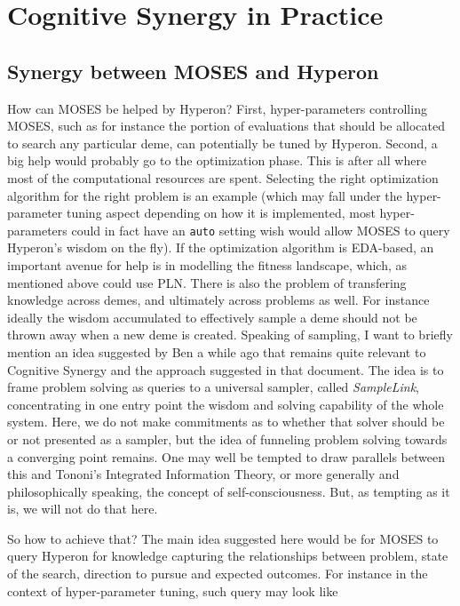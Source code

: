 \documentclass[]{report}
\begin{document}
\chapter{Cognitive Synergy in Practice}

\section{Synergy between MOSES and Hyperon}

How can MOSES be helped by Hyperon?  First, hyper-parameters
controlling MOSES, such as for instance the portion of evaluations
that should be allocated to search any particular deme, can
potentially be tuned by Hyperon.  Second, a big help would probably go
to the optimization phase.  This is after all where most of the
computational resources are spent.  Selecting the right optimization
algorithm for the right problem is an example (which may fall under
the hyper-parameter tuning aspect depending on how it is implemented,
most hyper-parameters could in fact have an \texttt{auto} setting wish
would allow MOSES to query Hyperon's wisdom on the fly).  If the
optimization algorithm is EDA-based, an important avenue for help is
in modelling the fitness landscape, which, as mentioned above could
use PLN.  There is also the problem of transfering knowledge across
demes, and ultimately across problems as well.  For instance ideally
the wisdom accumulated to effectively sample a deme should not be
thrown away when a new deme is created.  Speaking of sampling, I want
to briefly mention an idea suggested by Ben a while ago that remains
quite relevant to Cognitive Synergy and the approach suggested in that
document.  The idea is to frame problem solving as queries to a
universal sampler, called \emph{SampleLink}, concentrating in one
entry point the wisdom and solving capability of the whole system.
Here, we do not make commitments as to whether that solver should be
or not presented as a sampler, but the idea of funneling problem
solving towards a converging point remains.  One may well be tempted
to draw parallels between this and Tononi's Integrated Information
Theory, or more generally and philosophically speaking, the concept of
self-consciousness.  But, as tempting as it is, we will not do that
here.

So how to achieve that?  The main idea suggested here would be for
MOSES to query Hyperon for knowledge capturing the relationships
between problem, state of the search, direction to pursue and expected
outcomes.  For instance in the context of hyper-parameter tuning, such
query may look like\\
\end{document}
